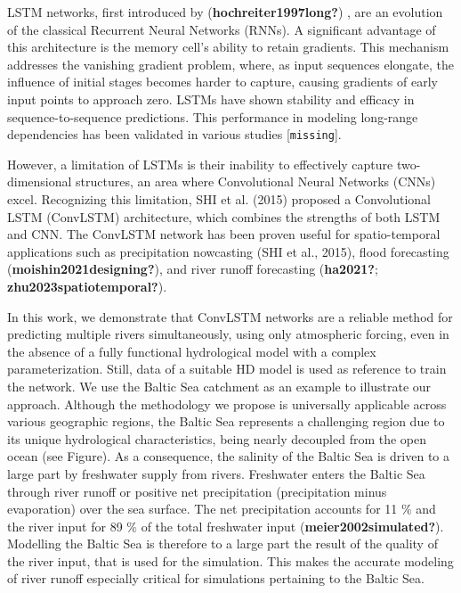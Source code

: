 \documentclass[
]{agujournal2019}
\begin{document}
LSTM networks, first introduced by (\textbf{hochreiter1997long?}) , are
an evolution of the classical Recurrent Neural Networks (RNNs). A
significant advantage of this architecture is the memory cell's ability
to retain gradients. This mechanism addresses the vanishing gradient
problem, where, as input sequences elongate, the influence of initial
stages becomes harder to capture, causing gradients of early input
points to approach zero. LSTMs have shown stability and efficacy in
sequence-to-sequence predictions. This performance in modeling
long-range dependencies has been validated in various studies
{[}\texttt{missing}{]}.

However, a limitation of LSTMs is their inability to effectively capture
two-dimensional structures, an area where Convolutional Neural Networks
(CNNs) excel. Recognizing this limitation, SHI et al. (2015) proposed a
Convolutional LSTM (ConvLSTM) architecture, which combines the strengths
of both LSTM and CNN. The ConvLSTM network has been proven useful for
spatio-temporal applications such as precipitation nowcasting (SHI et
al., 2015), flood forecasting (\textbf{moishin2021designing?}), and
river runoff forecasting (\textbf{ha2021?};
\textbf{zhu2023spatiotemporal?}).

In this work, we demonstrate that ConvLSTM networks are a reliable
method for predicting multiple rivers simultaneously, using only
atmospheric forcing, even in the absence of a fully functional
hydrological model with a complex parameterization. Still, data of a
suitable HD model is used as reference to train the network. We use the
Baltic Sea catchment as an example to illustrate our approach. Although
the methodology we propose is universally applicable across various
geographic regions, the Baltic Sea represents a challenging region due
to its unique hydrological characteristics, being nearly decoupled from
the open ocean (see Figure). As a consequence, the salinity of the
Baltic Sea is driven to a large part by freshwater supply from rivers.
Freshwater enters the Baltic Sea through river runoff or positive net
precipitation (precipitation minus evaporation) over the sea surface.
The net precipitation accounts for 11 \(\%\) and the river input for 89
\(\%\) of the total freshwater input (\textbf{meier2002simulated?}).
Modelling the Baltic Sea is therefore to a large part the result of the
quality of the river input, that is used for the simulation. This makes
the accurate modeling of river runoff especially critical for
simulations pertaining to the Baltic Sea.
\end{document}
